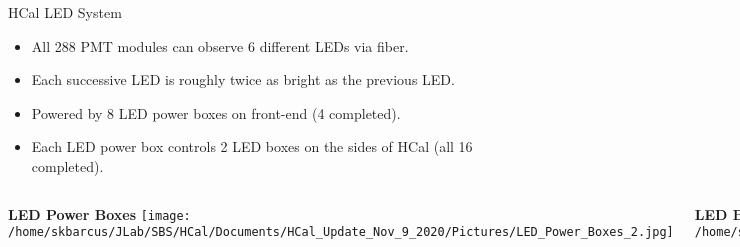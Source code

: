 \documentclass[10pt]{beamer}
\begin{document}
\begin{frame}{HCal LED System}

    \begin{itemize}
		\item All 288 PMT modules can observe 6 different LEDs via fiber.
		\item Each successive LED is roughly twice as bright as the previous LED.
        \item Powered by 8 LED power boxes on front-end (4 completed).
        \item Each LED power box controls 2 LED boxes on the sides of HCal (all 16 completed).
    \end{itemize}
    
    \begin{columns}[T,onlytextwidth]
	
	\vspace{-3mm}
	\begin{center}
	    \textbf{LED Power Boxes}
	    \texttt{[image: /home/skbarcus/JLab/SBS/HCal/Documents/HCal\_Update\_Nov\_9\_2020/Pictures/LED\_Power\_Boxes\_2.jpg]}
  	\end{center}
	
	
	\vspace{-3mm}
	\begin{center}
		\textbf{LED Boxes}
		\texttt{[image: /home/skbarcus/JLab/SBS/HCal/Documents/HCal\_Update\_Nov\_9\_2020/Pictures/LED\_Boxes.jpg]}
  	\end{center}
	
	\end{columns}

\end{frame}

%
%
%
\end{document}
